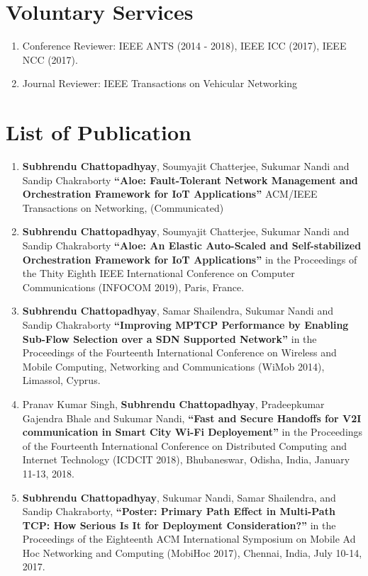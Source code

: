 \documentclass{res}
\newcommand{\papertitle}[1]{\textbf{ ``#1''}}
\begin{document}
\begin{resume}
\section{Voluntary Services}
  \begin{enumerate}
   \item Conference Reviewer: IEEE ANTS (2014 - 2018), IEEE ICC (2017), IEEE NCC (2017).
   \item Journal Reviewer: IEEE Transactions on Vehicular Networking
  \end{enumerate}
\section{List of Publication} 
	\begin{enumerate}
        \item {\bf Subhrendu Chattopadhyay}, Soumyajit Chatterjee, Sukumar Nandi and Sandip Chakraborty \papertitle{Aloe: Fault-Tolerant Network Management and Orchestration Framework for IoT Applications} ACM/IEEE Transactions on Networking, (Communicated)
        \item  {\bf Subhrendu Chattopadhyay}, Soumyajit Chatterjee, Sukumar Nandi and Sandip Chakraborty \papertitle{Aloe: An Elastic Auto-Scaled and Self-stabilized Orchestration Framework for IoT Applications} in the Proceedings of the Thity Eighth IEEE International Conference on Computer Communications (INFOCOM 2019), Paris, France.
        \item {\bf Subhrendu Chattopadhyay}, Samar Shailendra, Sukumar Nandi and Sandip Chakraborty \papertitle{Improving MPTCP Performance by Enabling Sub-Flow Selection over a SDN Supported Network} in the Proceedings of the Fourteenth International Conference on Wireless and Mobile Computing, Networking and Communications (WiMob 2014), Limassol, Cyprus. 
		\item Pranav Kumar Singh, {\bf Subhrendu Chattopadhyay}, Pradeepkumar Gajendra Bhale and Sukumar Nandi, \papertitle{Fast and Secure Handoffs for V2I communication in Smart City Wi-Fi Deployement} in the Proceedings of the Fourteenth International Conference on Distributed Computing and Internet Technology (ICDCIT 2018), Bhubaneswar, Odisha, India, January 11-13, 2018. 
		\item {\bf Subhrendu Chattopadhyay}, Sukumar Nandi, Samar Shailendra, and Sandip Chakraborty,\papertitle{Poster: Primary Path Effect in Multi-Path TCP: How Serious Is It for Deployment Consideration?} in the Proceedings of the Eighteenth ACM International Symposium on Mobile Ad Hoc Networking and Computing (MobiHoc 2017), Chennai, India, July 10-14, 2017. 

\end{enumerate}
\end{resume}
\end{document}
